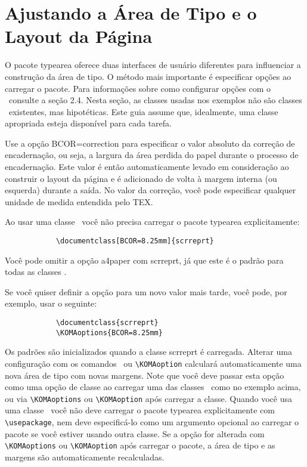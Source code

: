 \chapter{Ajustando a Área de Tipo e o Layout da Página}
O pacote typearea oferece duas interfaces de usuário diferentes para influenciar a construção da área de tipo. O método mais importante é especificar opções ao carregar o pacote. Para informações sobre como configurar opções com o \KOMAScript\ consulte a seção 2.4. Nesta seção, as classes usadas nos exemplos não são classes \KOMAScript\ existentes, mas hipotéticas. Este guia assume que, idealmente, uma classe apropriada esteja disponível para cada tarefa.

Use a opção BCOR=correction para especificar o valor absoluto da correção de encadernação, ou seja, a largura da área perdida do papel durante o processo de encadernação. Este valor é então automaticamente levado em consideração ao construir o layout da página e é adicionado de volta à margem interna (ou esquerda) durante a saída. No valor da correção, você pode especificar qualquer unidade de medida entendida pelo TEX.

Ao usar uma classe \KOMAScript\ você não precisa carregar o pacote typearea explicitamente:
\begin{verbatim}
            \documentclass[BCOR=8.25mm]{scrreprt}
\end{verbatim}

Você pode omitir a opção a4paper com scrreprt, já que este é o padrão para todas as classes \KOMAScript.

Se você quiser definir a opção para um novo valor mais tarde, você pode, por exemplo, usar o seguinte:
\begin{verbatim}
            \documentclass{scrreprt}
            \KOMAoptions{BCOR=8.25mm}
\end{verbatim}

Os padrões são inicializados quando a classe scrreprt é carregada. Alterar uma configuração com os comandos \KOMAScript\ ou \verb|\KOMAoption| calculará automaticamente uma nova área de tipo com novas margens.
Note que você deve passar esta opção como uma opção de classe ao carregar uma das classes \KOMAScript\ como no exemplo acima, ou via \verb|\KOMAoptions| ou \verb|\KOMAoption| após carregar a classe. Quando você usa uma classe \KOMAScript\ você não deve carregar o pacote typearea explicitamente com \verb|\usepackage|, nem deve especificá-lo como um argumento opcional ao carregar o pacote se você estiver usando outra classe. Se a opção for alterada com \verb|\KOMAoptions| ou \verb|\KOMAoption| após carregar o pacote, a área de tipo e as margens são automaticamente recalculadas.

